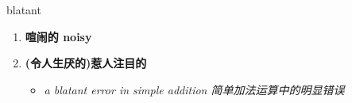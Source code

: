 
\begin{frame}
{\huge blatant}
\begin{center}
\begin{enumerate}\Large
  \item \textbf{喧闹的 noisy}
  \item \textbf{(令人生厌的)惹人注目的}
  \begin{itemize}
    \item \em{\Large{a blatant error in simple addition 简单加法运算中的明显错误}}
  \end{itemize}
\end{enumerate}
\end{center}
\end{frame}
